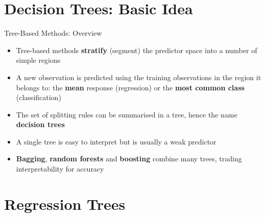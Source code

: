 

\section{Decision Trees: Basic Idea}


\begin{frame}{Tree-Based Methods: Overview}
    \begin{itemize}
        \item Tree-based methods \textbf{stratify} (segment) the predictor space into a number of simple regions
        \item A new observation is predicted using the training observations in the region it belongs to: the \textbf{mean} response (regression) or the \textbf{most common class} (classification)
        \item The set of splitting rules can be summarised in a tree, hence the name \textbf{decision trees}
        \item A single tree is easy to interpret but is usually a weak predictor
        \item \textbf{Bagging}, \textbf{random forests} and \textbf{boosting} combine many trees, trading interpretability for accuracy
    \end{itemize}
\end{frame}


\section{Regression Trees}


